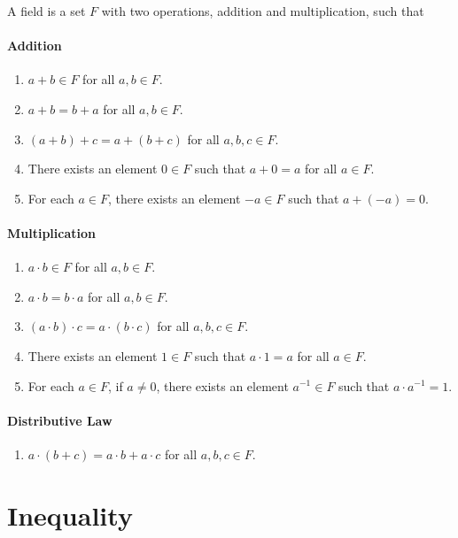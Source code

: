 \documentclass[12pt]{article}
\begin{document}
\begin{definition}[Field]
	A field is a set $F$ with two operations, addition and multiplication, such that
	\paragraph{Addition}
	\begin{enumerate}
		\item $a+b \in F$ for all $a,b \in F$.
		\item $a+b = b+a$ for all $a,b \in F$.
		\item $(a+b)+c = a+(b+c)$ for all $a,b,c \in F$.
		\item There exists an element $0 \in F$ such that $a+0 = a$ for all $a \in F$.
		\item For each $a \in F$, there exists an element $-a \in F$ such that $a+(-a) = 0$.
	\end{enumerate}
	\paragraph{Multiplication}
	\begin{enumerate}
		\item $a \cdot b \in F$ for all $a,b \in F$.
		\item $a \cdot b = b \cdot a$ for all $a,b \in F$.
		\item $(a \cdot b) \cdot c = a \cdot (b \cdot c)$ for all $a,b,c \in F$.
		\item There exists an element $1 \in F$ such that $a \cdot 1 = a$ for all $a \in F$.
		\item For each $a \in F$, if $a \neq 0$, there exists an element $a^{-1} \in F$ such that $a \cdot a^{-1} = 1$.
	\end{enumerate}
	\paragraph{Distributive Law}
	\begin{enumerate}
		\item $a \cdot (b+c) = a \cdot b + a \cdot c$ for all $a,b,c \in F$.
	\end{enumerate}
\end{definition}

\section{Inequality}
\end{document}
